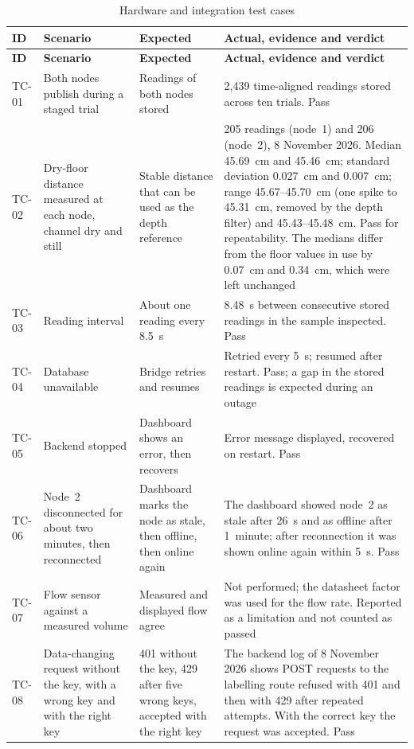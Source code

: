 \documentclass[12pt, a4paper]{article}
\begin{document}
\begin{longtable}{|p{1.2cm}|p{3.3cm}|p{3.2cm}|p{6.0cm}|}
\caption{Hardware and integration test cases}\label{tab:iot-tests}\\
\hline
\textbf{ID} & \textbf{Scenario} & \textbf{Expected} & \textbf{Actual, evidence and verdict} \\
\hline
\endfirsthead
\hline
\textbf{ID} & \textbf{Scenario} & \textbf{Expected} & \textbf{Actual, evidence and verdict} \\
\hline
\endhead
TC-01 & Both nodes publish during a staged trial & Readings of both nodes stored & 2{,}439 time-aligned readings stored across ten trials. Pass \\
\hline
TC-02 & Dry-floor distance measured at each node, channel dry and still & Stable distance that can be used as the depth reference & 205 readings (node~1) and 206 (node~2), 8 November 2026. Median 45.69~cm and 45.46~cm; standard deviation 0.027~cm and 0.007~cm; range 45.67--45.70~cm (one spike to 45.31~cm, removed by the depth filter) and 45.43--45.48~cm. Pass for repeatability. The medians differ from the floor values in use by 0.07~cm and 0.34~cm, which were left unchanged \\
\hline
TC-03 & Reading interval & About one reading every 8.5~s & 8.48~s between consecutive stored readings in the sample inspected. Pass \\
\hline
TC-04 & Database unavailable & Bridge retries and resumes & Retried every 5~s; resumed after restart. Pass; a gap in the stored readings is expected during an outage \\
\hline
TC-05 & Backend stopped & Dashboard shows an error, then recovers & Error message displayed, recovered on restart. Pass \\
\hline
TC-06 & Node~2 disconnected for about two minutes, then reconnected & Dashboard marks the node as stale, then offline, then online again & The dashboard showed node~2 as stale after 26~s and as offline after 1~minute; after reconnection it was shown online again within 5~s. Pass \\
\hline
TC-07 & Flow sensor against a measured volume & Measured and displayed flow agree & Not performed; the datasheet factor was used for the flow rate. Reported as a limitation and not counted as passed \\
\hline
TC-08 & Data-changing request without the key, with a wrong key and with the right key & 401 without the key, 429 after five wrong keys, accepted with the right key & The backend log of 8 November 2026 shows POST requests to the labelling route refused with 401 and then with 429 after repeated attempts. With the correct key the request was accepted. Pass \\

\end{longtable}
\end{document}
